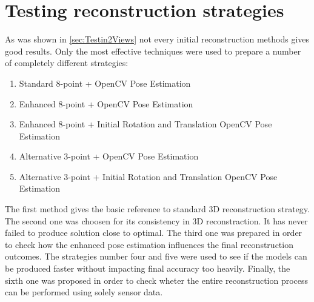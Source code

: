 \section{Testing reconstruction strategies}
As was shown in \ref{sec:Testin2Views} not every initial reconstruction methods gives good results. Only the most effective techniques were used to prepare a number of completely different strategies:
\begin{enumerate}
\item \textnormal{Standard 8-point + OpenCV Pose Estimation} 
\item \textnormal{Enhanced 8-point + OpenCV Pose Estimation} 
\item \textnormal{Enhanced 8-point + Initial Rotation and Translation OpenCV Pose Estimation} 
\item \textnormal{Alternative 3-point + OpenCV Pose Estimation}
\item \textnormal{Alternative 3-point + Initial Rotation and Translation OpenCV Pose Estimation}
\end{enumerate}
The first method gives the basic reference to standard 3D reconstruction strategy. The second one was choosen for its consistency in 3D reconstraction. It has never failed to produce solution close to optimal. The third one was prepared in order to check how the enhanced pose estimation influences the final reconstruction outcomes. The strategies number four and five were used to see if the models can be produced faster without impacting final accuracy too heavily. Finally, the sixth one was proposed in order to check wheter the entire reconstruction process can be performed using solely sensor data.

